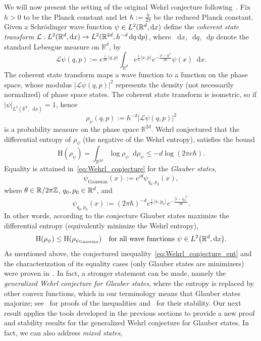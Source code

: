 \documentclass[AHL,Unicode,longabstracts]{cedram}
\newcommand{\R}{\mathbb R}
\newcommand{\bbZ}{\mathbb Z}
\newcommand{\Ent}{\mathrm H}
\newcommand{\prob}{\rho}
\newcommand*\diff{\mathop{}\!\mathrm{d}}
\newcommand{\cotrans}{\mathcal L}
\newcommand{\wave}{\psi}
\newcommand{\waveg}{\psi_{\mathrm{Gaussian}}}
\renewcommand*{\to}{\mathchoice{\longrightarrow}{\rightarrow}{\rightarrow}{\rightarrow}}
\let\originalleft\left
\let\originalright\right
\renewcommand{\left}{\mathopen{}\mathclose\bgroup\originalleft}
\renewcommand{\right}{\aftergroup\egroup\originalright}
\let\oldin\in
\renewcommand{\in}{\mathchoice{\oldin}{\oldin}{\,\oldin\,}{\,\oldin\,}}
\begin{document}
We will now present the setting of the original Wehrl conjecture following~\cite{MR1105661}. Fix $h>0$ to be the Planck constant and let $\hbar:=\frac{h}{2\pi}$ be the reduced Planck constant. Given a Schr\"odinger wave function $\wave\in L^2(\R^d,\diff x)$ define the \emph{coherent state transform} $\cotrans:L^2(\R^d,\diff x)\to L^2(\R^{2d},h^{-d}\diff q\diff p)$, where $\diff x,\diff q,\diff p$ denote the standard Lebesgue measure on $\R^{d}$, by
\begin{equation}\label{eq:conerent_transform_def}
\cotrans \wave(q,p):=e^{\frac{i}{2\hbar}\langle q,p\rangle}\int_{\R^{d}}e^{\frac{i}{\hbar}\langle x,p\rangle}e^{-\frac{|x-q|^2}{2\hbar}}\wave(x)\diff x.
\end{equation}
The coherent state transform maps a wave function to a function on the phase space, whose modulus $|\cotrans \wave(q,p)|^2$ represents the density (not necessarily normalized) of phase space states. The coherent state transform is isometric, so if $|\psi|_{L^2(\R^{d},\diff x)}=1$, hence
\begin{equation}\label{eq:phase_prob_def}
\prob_{\wave}(q,p):=h^{-d}|\cotrans \wave(q,p)|^2
\end{equation}
is a probability measure on the phase space $\R^{2d}$. Wehrl conjectured that the differential entropy of $\prob_{\wave}$ (the negative of the Wehrl entropy), satisfies the bound
\begin{equation}\label{eq:Wehrl_conjecture}
\Ent(\prob_{\wave})=\int_{\R^{2d}}\log \prob_{\wave} \diff \prob_{\wave} \le -d\log (2\pi e\hbar).
\end{equation}
Equality is attained in~\eqref{eq:Wehrl_conjecture} for the \emph{Glauber states},
\begin{equation}\label{eq:Gaussian_state}
\waveg(x):=e^{i\theta}\wave_{q_0,p_0}(x),
\end{equation}
where $\theta \in \R/ 2\pi\bbZ $, $q_0,p_0\in\R^{d}$, and
\[
\wave_{q_0,p_0}(x):=(2\pi\hbar)^{-d} e^{\frac{i}{\hbar}\langle x,p_0\rangle}e^{-\frac{|x-q_0|^2}{2\hbar}}.
\]
In other words, according to the conjecture Glauber states maximize the differential entropy (equivalently minimize the Wehrl entropy),
\begin{equation}\label{eq:Wehrl_conjecture_ent}
\Ent(\prob_{\wave})\le \Ent\left(\prob_{\waveg}\right)\quad\text{for all wave functions }\wave\in L^2\left(\R^d,\diff x\right).
\end{equation}
As mentioned above, the conjectured inequality~\eqref{eq:Wehrl_conjecture_ent} and the characterization of its equality cases (only Glauber states are minimizers) were proven in~\cite{MR1105661,MR0506364}. In fact, a stronger statement can be made, namely the \emph{generalized Wehrl conjecture for Glauber states}, where the entropy is replaced by other convex functions, which in our terminology means that Glauber states majorize; see~\cite{MR4580699,kulikov2022monotonicity} for proofs of the inequalities and~\cite{frank2023generalized} for their stability. Our next result applies the tools developed in the previous sections to provide a new proof and stability results for the generalized Wehrl conjecture for Glauber states. In fact, we can also address \emph{mixed states},
\end{document}
